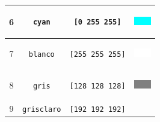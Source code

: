 \begin{center}
\begin{longtable}{|*{4}{c|}}
    6 & \texttt{cyan} \index{cyan@\texttt{cyan}}
      & \texttt{[0  255 255]} & \begin{minipage}[m]{1.5cm} \begin{center}
                 \vspace{0.2cm} %
              \includegraphics{Imagenes/05_Primitivas/06_cyan.png}
                 \vspace{0.2cm} \end{center} \end{minipage} \\ \hline
    7 & \texttt{blanco} \index{blanco@\texttt{blanco}}
      & \texttt{[255 255 255]} & \begin{minipage}[m]{1.5cm} \begin{center}
                \vspace{0.2cm} %
              \includegraphics{Imagenes/05_Primitivas/07_blanco.png}
                \vspace{0.2cm} \end{center} \end{minipage} \\ \hline
    8 & \texttt{gris} \index{gris@\texttt{gris}}
      & \texttt{[128 128 128]} &  \begin{minipage}[m]{1.5cm} \begin{center}
                 \vspace{0.2cm} %
              \includegraphics{Imagenes/05_Primitivas/08_gris.png}
                 \vspace{0.2cm} \end{center}
                              \end{minipage} \\ \hline
    9 & \texttt{grisclaro} \index{grisclaro@\texttt{grisclaro}}
      & \texttt{[192 192 192]} & \begin{minipage}[m]{1.5cm} \begin{center}
                 \vspace{0.2cm} %

\end{center}
\end{minipage}
\end{longtable}
\end{center}
